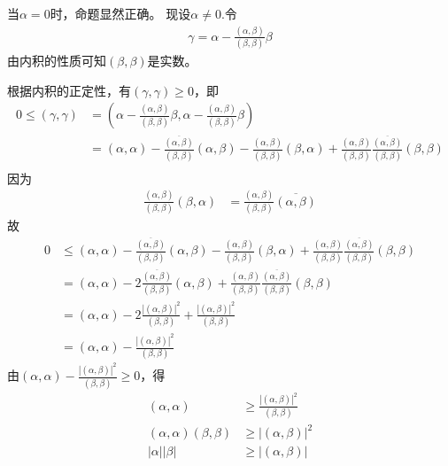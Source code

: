 \documentclass{article}
\begin{document}
当$\alpha = 0$时，命题显然正确。
现设$\alpha \neq 0$.令
\begin{align*}
  \gamma = \alpha - \frac{(\alpha, \beta)}{(\beta, \beta)} \beta
\end{align*}
由内积的性质可知$(\beta, \beta)$是实数。

根据内积的正定性，有$(\gamma, \gamma) \geq 0$，即
\begin{align*}
  0 \leq (\gamma, \gamma)
   & = (\alpha - \frac{(\alpha, \beta)}{(\beta, \beta)} \beta, \alpha - \frac{(\alpha, \beta)}{(\beta, \beta)} \beta)                                                \\
   & = (\alpha, \alpha) - \frac{\overline{(\alpha, \beta)}}{(\beta, \beta)} (\alpha, \beta)
  - \frac{(\alpha, \beta)}{(\beta, \beta)} (\beta, \alpha) + \frac{(\alpha, \beta)}{(\beta, \beta)} \frac{\overline{(\alpha, \beta)}}{(\beta, \beta)} (\beta, \beta) \\
\end{align*}
因为
\begin{align*}
  \frac{(\alpha, \beta)}{(\beta, \beta)} (\beta, \alpha)
   & = \frac{(\alpha, \beta)}{(\beta, \beta)} \overline{(\alpha, \beta)}
\end{align*}
故
\begin{align*}
  0 & \leq  (\alpha, \alpha) - \frac{\overline{(\alpha, \beta)}}{(\beta, \beta)} (\alpha, \beta)
  - \frac{(\alpha, \beta)}{(\beta, \beta)} (\beta, \alpha) + \frac{(\alpha, \beta)}{(\beta, \beta)} \frac{\overline{(\alpha, \beta)}}{(\beta, \beta)} (\beta, \beta)                                     \\
    & = (\alpha, \alpha) - 2 \frac{\overline{(\alpha, \beta)}}{(\beta, \beta)} (\alpha, \beta) + \frac{(\alpha, \beta)}{(\beta, \beta)} \frac{\overline{(\alpha, \beta)}}{(\beta, \beta)} (\beta, \beta) \\
    & = (\alpha, \alpha) - 2 \frac{|(\alpha, \beta)|^2}{(\beta, \beta)} + \frac{|(\alpha, \beta)|^2}{(\beta, \beta)}                                                                                     \\
    & = (\alpha, \alpha) - \frac{|(\alpha, \beta)|^2}{(\beta, \beta)}
\end{align*}
由$(\alpha, \alpha) - \frac{|(\alpha, \beta)|^2}{(\beta, \beta)} \geq 0$，得
\begin{align*}
  (\alpha, \alpha)                & \geq \frac{|(\alpha, \beta)|^2}{(\beta, \beta)} \\
  (\alpha, \alpha) (\beta, \beta) & \geq |(\alpha, \beta)|^2                        \\
  |\alpha| |\beta|                & \geq |(\alpha, \beta)|
\end{align*}
\end{document}
